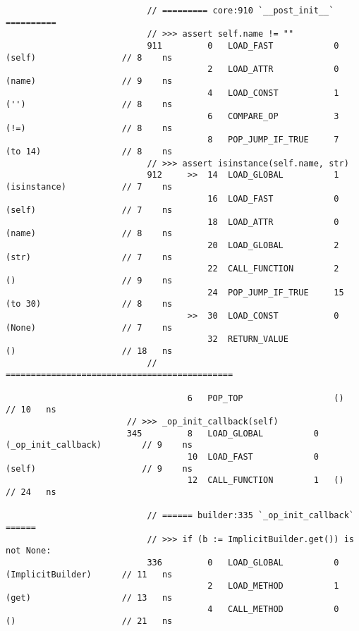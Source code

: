\begin{code}
\begin{verbatim}
                            // ========= core:910 `__post_init__` ==========
                            // >>> assert self.name != ""
                            911         0   LOAD_FAST            0   (self)                 // 8    ns
                                        2   LOAD_ATTR            0   (name)                 // 9    ns
                                        4   LOAD_CONST           1   ('')                   // 8    ns
                                        6   COMPARE_OP           3   (!=)                   // 8    ns
                                        8   POP_JUMP_IF_TRUE     7   (to 14)                // 8    ns
                            // >>> assert isinstance(self.name, str)
                            912     >>  14  LOAD_GLOBAL          1   (isinstance)           // 7    ns
                                        16  LOAD_FAST            0   (self)                 // 7    ns
                                        18  LOAD_ATTR            0   (name)                 // 8    ns
                                        20  LOAD_GLOBAL          2   (str)                  // 7    ns
                                        22  CALL_FUNCTION        2   ()                     // 9    ns
                                        24  POP_JUMP_IF_TRUE     15  (to 30)                // 8    ns
                                    >>  30  LOAD_CONST           0   (None)                 // 7    ns
                                        32  RETURN_VALUE             ()                     // 18   ns
                            // =============================================

                                    6   POP_TOP                  ()                         // 10   ns
                        // >>> _op_init_callback(self)
                        345         8   LOAD_GLOBAL          0   (_op_init_callback)        // 9    ns
                                    10  LOAD_FAST            0   (self)                     // 9    ns
                                    12  CALL_FUNCTION        1   ()                         // 24   ns

                            // ====== builder:335 `_op_init_callback` ======
                            // >>> if (b := ImplicitBuilder.get()) is not None:
                            336         0   LOAD_GLOBAL          0   (ImplicitBuilder)      // 11   ns
                                        2   LOAD_METHOD          1   (get)                  // 13   ns
                                        4   CALL_METHOD          0   ()                     // 21   ns


\end{verbatim}
\end{code}
